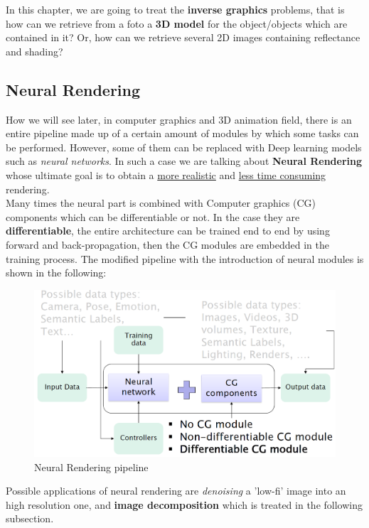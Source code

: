 In this chapter, we are going to treat the \textbf{inverse graphics} problems, that is how can we retrieve from a foto a \textbf{3D model} for the object/objects which are contained in it? Or, how can we retrieve several 2D images containing reflectance and shading?

\subsection{Neural Rendering}
How we will see later, in computer graphics and 3D animation field, there is an entire pipeline made up of a certain amount of modules by which some tasks can be performed. However, some of them can be replaced with Deep learning models such as \textit{neural networks}. In such a case we are talking about \textbf{Neural Rendering} whose ultimate goal is to obtain a \underline{more realistic} and \underline{less time consuming} rendering.\\
Many times the neural part is combined with Computer graphics (CG) components which can be differentiable or not. In the case they are \textbf{differentiable}, the entire architecture can be trained end to end by using forward and back-propagation, then the CG modules are embedded in the training process. The modified pipeline with the introduction of neural modules is shown in the following: 

\begin{figure}[h]
    \centering
    \includegraphics[scale=0.5]{img/NeuralRendering.png}
    \caption{Neural Rendering pipeline}
    \label{img:NeuralRendering}
\end{figure}

Possible applications of neural rendering are \textit{denoising} a 'low-fi' image into an high resolution one, and \textbf{image decomposition} which is treated in the following subsection.

